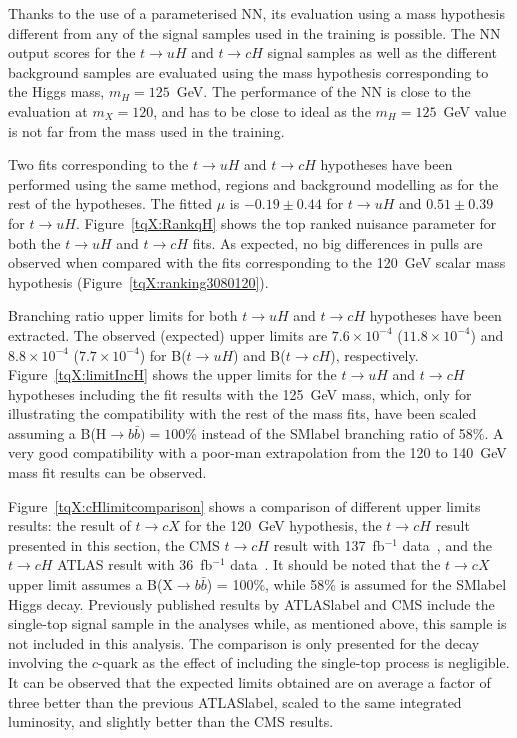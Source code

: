Thanks to the use of a parameterised NN, its evaluation using a mass hypothesis different from any of the signal samples used in the training is possible. The NN output scores for the $t\to uH$ and $t\to cH$ signal samples as well as the different background samples are evaluated using the mass hypothesis corresponding to the Higgs mass, $m_H=125$~GeV. The performance of the NN is close to the evaluation at $m_X=120$, and has to be close to ideal as the $m_H=125$~GeV value is not far from the mass used in the training.

Two fits corresponding to the $t\to uH$ and $t\to cH$ hypotheses have been performed using the same method, regions and background modelling as for the rest of the hypotheses. The fitted $\mu$ is $-0.19\pm0.44$ for $t\to uH$ and $0.51\pm0.39$ for $t\to uH$. Figure~\ref{tqX:RankqH} shows the top ranked nuisance parameter for both the $t\to uH$ and $t\to cH$ fits. As expected, no big differences in pulls are observed when compared with the fits corresponding to the 120~GeV scalar mass hypothesis (Figure~\ref{tqX:ranking3080120}).

Branching ratio upper limits for both $t\to uH$ and $t\to cH$ hypotheses have been extracted. The observed (expected) upper limits are $7.6\times10^{-4}$ ($11.8\times10^{-4}$) and $8.8\times10^{-4}$ ($7.7\times10^{-4}$) for B($t\to uH$) and B($t\to cH$), respectively. Figure~\ref{tqX:limitIncH} shows the upper limits for the $t\to uH$ and $t\to cH$ hypotheses including the fit results with the 125~GeV mass, which, only for illustrating the compatibility with the rest of the mass fits, have been scaled assuming a B(H$\rightarrow b \bar{b}) = 100\%$ instead of the \acrshort{SMlabel} branching ratio of 58\%. A very good compatibility with a poor-man extrapolation from the 120 to 140~GeV mass fit results can be observed.

Figure~\ref{tqX:cHlimitcomparison} shows a comparison of different upper limits results: the result of $t\to cX$ for the 120~GeV hypothesis, the $t\to cH$ result presented in this section, the CMS $t\to cH$ result with 137~fb$^{-1}$ data~\cite{CMStqHRun2}, and the $t\to cH$ ATLAS result with 36~fb$^{-1}$ data~\cite{TOPQ-2017-07}. It should be noted that the $t\to cX$ upper limit assumes a B(X$\rightarrow b \bar{b}$) = 100\%, while 58\% is assumed for the \acrshort{SMlabel} Higgs decay. Previously published results by \acrshort{ATLASlabel} and CMS include the single-top signal sample in the analyses while, as mentioned above, this sample is not included in this analysis. The comparison is only presented for the decay involving the $c$-quark as the effect of including the single-top process is negligible. It can be observed that the expected limits obtained are on average a factor of three better than the previous \acrshort{ATLASlabel}, scaled to the same integrated luminosity, and slightly better than the CMS results.

